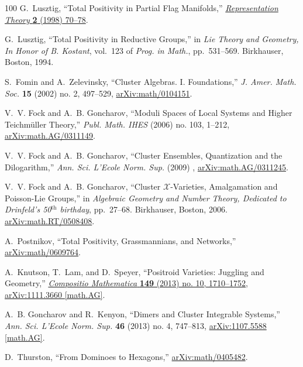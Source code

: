 \documentclass[12pt,hyperref,compress]{JHEP3}
\begin{document}
\begin{thebibliography}{100}
G.~Lusztig, ``{Total Positivity in Partial Flag Manifolds},''
  \href{http://dx.doi.org/10.1090/S1088-4165-98-00046-6}{{\em {Representation
  Theory}} {\bf 2} (1998)  70--78}.

G.~Lusztig, ``{Total Positivity in Reductive Groups},'' in {\em Lie Theory and
  Geometry, In Honor of B. Kostant}, vol.~123 of {\em Prog. in Math.},
  pp.~531--569.
\newblock Birkhauser, Boston, 1994.

S.~Fomin and A.~Zelevinsky, ``{Cluster Algebras. I. Foundations},'' {\em J.
  Amer. Math. Soc.} {\bf 15} (2002) no. 2, 497--529,
  \href{http://arxiv.org/abs/math/0104151}{{ arXiv:math/0104151}}.

V.~V. Fock and A.~B. Goncharov, ``{Moduli Spaces of Local Systems and Higher
  Teichm\"uller Theory},'' {\em Publ. Math. IHES} (2006) no. 103, 1--212,
  \href{http://arxiv.org/abs/math.AG/0311149}{{ arXiv:math.AG/0311149}}.

V.~V. Fock and A.~B. Goncharov, ``{Cluster Ensembles, Quantization and the
  Dilogarithm},'' {\em Ann. Sci. L'Ecole Norm. Sup.} (2009)  ,
  \href{http://arxiv.org/abs/math.AG/0311245}{{ arXiv:math.AG/0311245}}.

V.~V. Fock and A.~B. Goncharov, ``{Cluster $\mathcal{X}$-Varieties,
  Amalgamation and Poisson-Lie Groups},'' in {\em Algebraic Geometry and Number
  Theory, Dedicated to Drinfeld's 50$^{\mathrm{th}}$ birthday}, pp.~27--68.
\newblock Birkhauser, Boston, 2006.
\newblock \href{http://arxiv.org/abs/math.RT/0508408}{{
  arXiv:math.RT/0508408}}.

A.~Postnikov, ``{Total Positivity, Grassmannians, and Networks},''
  \href{http://arxiv.org/abs/math/0609764}{{ arXiv:math/0609764}}.

A.~Knutson, T.~Lam, and D.~Speyer, ``{Positroid Varieties: Juggling and
  Geometry},'' \href{http://dx.doi.org/10.1112/S0010437X13007240}{{\em
  {Compositio Mathematica}} {\bf 149} (2013) no. 10, 1710--1752},
  \href{http://arxiv.org/abs/1111.3660}{{ arXiv:1111.3660 [math.AG]}}.

A.~B. Goncharov and R.~Kenyon, ``{Dimers and Cluster Integrable Systems},''
  {\em Ann. Sci. L'Ecole Norm. Sup.} {\bf 46} (2013) no. 4, 747--813,
\href{http://arxiv.org/abs/1107.5588}{{ arXiv:1107.5588 [math.AG]}}.

D.~Thurston, ``{From Dominoes to Hexagons},''
  \href{http://arxiv.org/abs/math/0405482}{{ arXiv:math/0405482}}.


\end{thebibliography}
\end{document}
